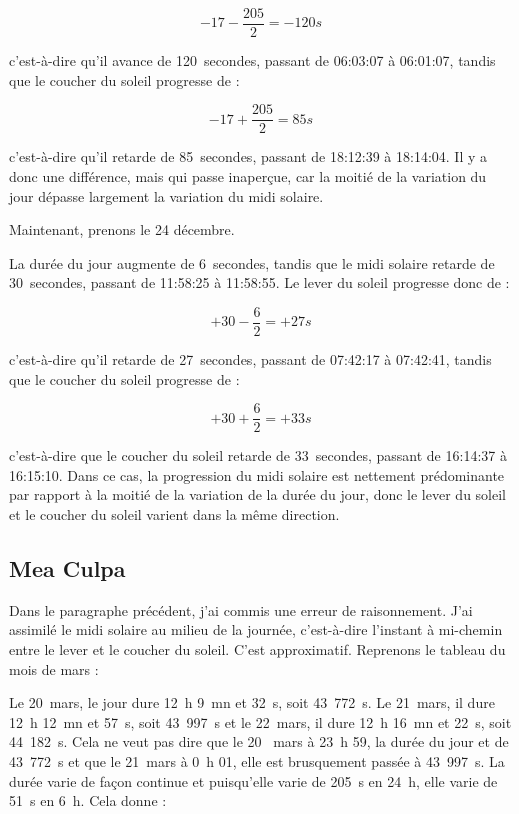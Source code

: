 \documentclass[a4paper]{article}
\newenvironment{texte}{\rmfamily}{}
\begin{document}
\begin{texte}
\[ -17 - \frac{205}{2} = -120 s \]

c'est-à-dire qu'il avance de 120~secondes,
passant de 06:03:07 à 06:01:07,
tandis que le coucher du soleil progresse de :

\[ -17 + \frac{205}{2} = 85 s \]

c'est-à-dire qu'il retarde de 85~secondes, passant de 18:12:39 à
18:14:04. Il y a donc une différence, mais qui passe inaperçue, car la
moitié de la variation du jour dépasse largement la variation du midi
solaire.

\vspace{5mm}

Maintenant, prenons le 24 décembre.

\vspace{2mm}
\vspace{2mm}

La durée du jour augmente de 6~secondes, tandis que le midi
solaire retarde de 30~secondes, passant de 11:58:25 à 11:58:55.
Le lever du soleil progresse donc de :

\[ +30 - \frac{6}{2} = +27 s \]

c'est-à-dire qu'il retarde de 27~secondes, passant
de 07:42:17 à 07:42:41, tandis que le
coucher du soleil progresse de :

\[ +30 + \frac{6}{2} = +33 s \]

c'est-à-dire que le coucher du soleil retarde de 33~secondes,
passant de 16:14:37 à 16:15:10.
Dans ce cas, la progression du midi solaire est nettement
prédominante par rapport à la moitié de la variation de la
durée du jour, donc le lever du soleil et le coucher
du soleil varient dans la même direction.

\vspace{5mm}

\subsection{Mea Culpa}

Dans le paragraphe précédent, j'ai commis une erreur de raisonnement.
J'ai assimilé le midi solaire au milieu de la journée, c'est-à-dire l'instant à mi-chemin entre
le lever et le coucher du soleil. C'est approximatif. Reprenons le
tableau du mois de mars :

\vspace{2mm}
\vspace{2mm}

Le 20~mars, le jour dure 12~h 9~mn et 32~s, soit 43~772~s.
Le 21~mars, il dure 12~h 12~mn et 57~s, soit 43~997~s
et le 22~mars, il dure 12~h 16~mn et 22~s, soit 44~182~s.
Cela ne veut pas dire que le 20~ mars à 23~h 59, la durée
du jour et de 43~772~s et que le 21~mars à 0~h 01, elle est
brusquement passée à 43~997~s. La durée varie de façon continue
et puisqu'elle varie de 205~s en 24~h, elle varie de 51~s en 6~h.
Cela donne :


\end{texte}
\end{document}
